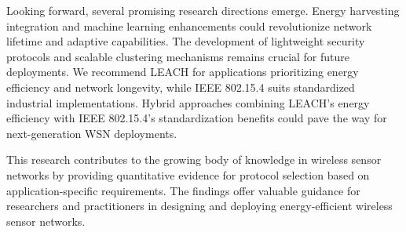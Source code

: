 \documentclass[conference]{IEEEtran}
\begin{document}
Looking forward, several promising research directions emerge. Energy harvesting integration and machine learning enhancements could revolutionize network lifetime and adaptive capabilities. The development of lightweight security protocols and scalable clustering mechanisms remains crucial for future deployments. We recommend LEACH for applications prioritizing energy efficiency and network longevity, while IEEE 802.15.4 suits standardized industrial implementations. Hybrid approaches combining LEACH's energy efficiency with IEEE 802.15.4's standardization benefits could pave the way for next-generation WSN deployments.

This research contributes to the growing body of knowledge in wireless sensor networks by providing quantitative evidence for protocol selection based on application-specific requirements. The findings offer valuable guidance for researchers and practitioners in designing and deploying energy-efficient wireless sensor networks.
\end{document}
